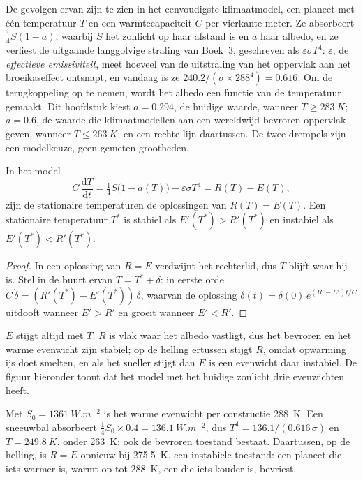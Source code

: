 De gevolgen ervan zijn te zien in het eenvoudigste klimaatmodel, een planeet met één temperatuur $T$ en
een warmtecapaciteit $C$ per vierkante meter. Ze absorbeert $\tfrac14 S(1 - a)$, waarbij $S$ het zonlicht
op haar afstand is en $a$ haar albedo, en ze verliest de uitgaande langgolvige straling van Boek~3,
geschreven als $\varepsilon\sigma T^4$: $\varepsilon$, de \emph{effectieve emissiviteit},
meet hoeveel van de uitstraling van het oppervlak aan het broeikaseffect ontsnapt, en vandaag is ze
$240.2/(\sigma\times288^4) = 0.616$. Om de terugkoppeling op te nemen, wordt het albedo een functie van
de temperatuur gemaakt. Dit hoofdstuk kiest $a = 0.294$, de huidige waarde, wanneer $T \ge \qty{283}{K}$; $a
= 0.6$, de waarde die klimaatmodellen aan een wereldwijd bevroren oppervlak geven, wanneer $T \le \qty{263}{K}$; en
een rechte lijn daartussen. De twee drempels zijn een modelkeuze, geen gemeten
grootheden.

\begin{proposition}\label{prop:b2:precambrian-earth:ebm}
In het model
\[
  C\,\frac{\mathrm dT}{\mathrm dt} = \tfrac14 S\bigl(1 - a(T)\bigr) - \varepsilon\sigma T^4
  = R(T) - E(T),
\]
zijn de stationaire temperaturen de oplossingen van $R(T) = E(T)$. Een stationaire temperatuur $T^*$ is
stabiel als $E'(T^*) > R'(T^*)$ en instabiel als $E'(T^*) < R'(T^*)$.
\end{proposition}

\begin{proof}
In een oplossing van $R = E$ verdwijnt het rechterlid, dus $T$ blijft waar hij is. Stel in de buurt ervan $T = T^*
+ \delta$: in eerste orde $C\,\dot\delta = (R'(T^*) - E'(T^*))\,\delta$, waarvan de oplossing
$\delta(t) = \delta(0)\,e^{(R' - E')t/C}$ uitdooft wanneer $E' > R'$ en groeit wanneer $E' < R'$.
\end{proof}

$E$ stijgt altijd met $T$. $R$ is vlak waar het albedo vastligt, dus het bevroren en het warme
evenwicht zijn stabiel; op de helling ertussen stijgt $R$, omdat opwarming ijs doet smelten, en als het
sneller stijgt dan $E$ is een evenwicht daar instabiel. De figuur hieronder toont dat het model met het huidige
zonlicht drie evenwichten heeft.

\begin{example}\label{ex:b2:precambrian-earth:three}
Met $S_0 = \qty{1361}{W.m^{-2}}$ is het warme evenwicht per constructie \qty{288}{K}. Een
sneeuwbal absorbeert $\tfrac14 S_0\times0.4 = \qty{136.1}{W.m^{-2}}$, dus $T^4 =
136.1/(0.616\,\sigma)$ en $T = \qty{249.8}{K}$, onder \qty{263}{K}: ook de bevroren toestand
bestaat. Daartussen, op de helling, is $R = E$ opnieuw bij \qty{275.5}{K}, een instabiele toestand: een
planeet die iets warmer is, warmt op tot \qty{288}{K}, een die iets kouder is, bevriest.
\end{example}

